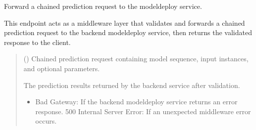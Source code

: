 \documentclass[letterpaper,10pt,english]{sphinxmanual}
\begin{document}
\begin{fulllineitems}
\label{\detokenize{modules/src.pig_sorting_api.main:src.pig_sorting_api.main.forward_chain_predict}}
\pysigstartsignatures
\pysiglinewithargsret
{}
{}
{}
\pysigstopsignatures
\sphinxAtStartPar
Forward a chained prediction request to the model\sphinxhyphen{}deploy service.

\sphinxAtStartPar
This endpoint acts as a middleware layer that validates and forwards
a chained prediction request to the backend model\sphinxhyphen{}deploy service,
then returns the validated response to the client.
\begin{quote}\begin{description}
\sphinxAtStartPar
{} ({\hyperref[\detokenize{modules/src.pig_sorting_api.main:src.pig_sorting_api.main.ChainPredictionRequest}]{}}) \textendash{} Chained prediction request
containing model sequence, input instances, and optional
parameters.

\sphinxAtStartPar
The prediction results returned by the
backend service after validation.

\sphinxAtStartPar
{\hyperref[\detokenize{modules/src.pig_sorting_api.main:src.pig_sorting_api.main.ChainPredictionResponse}]{}}

\sphinxAtStartPar
{} \textendash{} \begin{itemize}
\item {} 
 Bad Gateway: If the backend model\sphinxhyphen{}deploy service
      returns an error response.
    \sphinxhyphen{} 500 Internal Server Error: If an unexpected middleware
      error occurs.

\end{itemize}


\end{description}\end{quote}

\end{fulllineitems}
\end{document}
